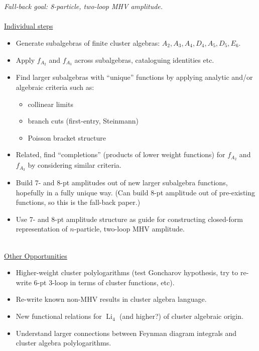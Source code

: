 \documentclass[12pt]{article}
\DeclareMathOperator{\Li}{Li}
\begin{document}
\thispagestyle{fancyplain}
 
\fancyhf{}


\\ \\
\emph{Fall-back goal: 8-particle, two-loop MHV amplitude.}\\ \\

\underline{Individual steps}
\begin{itemize}
	\item Generate subalgebras of finite cluster algebras: $A_2, A_3, A_4, D_4, A_5, D_5, E_6$.
	\item Apply $f_{A_2}$ and $f_{A_3}$ across subalgebras, cataloguing identities etc.
	\item Find larger subalgebras with ``unique'' functions by applying analytic and/or algebraic criteria such as:
		\begin{itemize}
		\item collinear limits
		\item branch cuts (first-entry, Steinmann)
		\item Poisson bracket structure
		\end{itemize}
	\item Related, find ``completions'' (products of lower weight functions) for $f_{A_2}$ and $f_{A_3}$ by considering similar criteria.
	\item Build 7- and 8-pt amplitudes out of new larger subalgebra functions, hopefully in a fully unique way. (Can build 8-pt amplitude out of pre-existing functions, so this is the fall-back paper.)
	\item Use 7- and 8-pt amplitude structure as guide for constructing closed-form representation of $n$-particle, two-loop MHV amplitude. \\\\
\end{itemize}

\underline{Other Opportunities}
\begin{itemize}
	\item Higher-weight cluster polylogarithms (test Goncharov hypothesis, try to re-write 6-pt 3-loop in terms of cluster functions, etc).
	\item Re-write known non-MHV results in cluster algebra language.
	\item New functional relations for $\Li_4$ (and higher?) of cluster algebraic origin.
	\item Understand larger connections between Feynman diagram integrals and cluster algebra polylogarithms.
\end{itemize}
\end{document}
